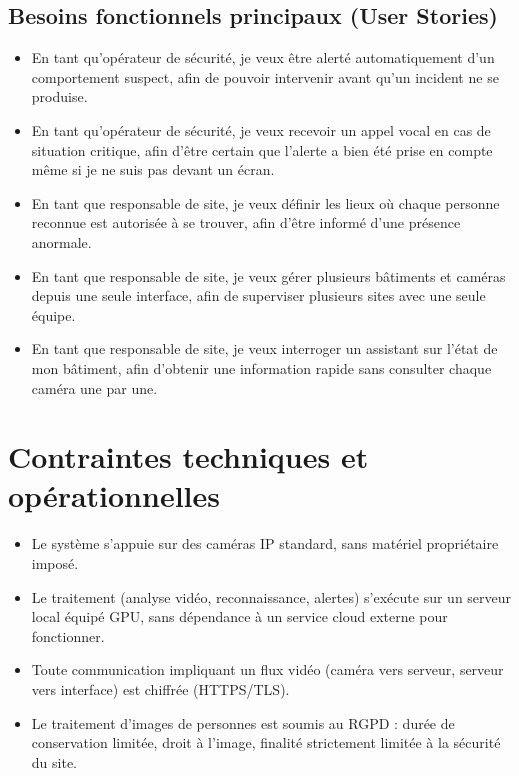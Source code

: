 \documentclass[11pt,a4paper]{article}
\begin{document}
\subsection{Besoins fonctionnels principaux (User Stories)}
\begin{itemize}[leftmargin=1.4em, itemsep=4pt]
  \item En tant qu'opérateur de sécurité, je veux être alerté automatiquement d'un comportement suspect, afin de pouvoir intervenir avant qu'un incident ne se produise.
  \item En tant qu'opérateur de sécurité, je veux recevoir un appel vocal en cas de situation critique, afin d'être certain que l'alerte a bien été prise en compte même si je ne suis pas devant un écran.
  \item En tant que responsable de site, je veux définir les lieux où chaque personne reconnue est autorisée à se trouver, afin d'être informé d'une présence anormale.
  \item En tant que responsable de site, je veux gérer plusieurs bâtiments et caméras depuis une seule interface, afin de superviser plusieurs sites avec une seule équipe.
  \item En tant que responsable de site, je veux interroger un assistant sur l'état de mon bâtiment, afin d'obtenir une information rapide sans consulter chaque caméra une par une.
\end{itemize}

\section{Contraintes techniques et opérationnelles}
\begin{itemize}[leftmargin=1.4em, itemsep=2pt]
  \item Le système s'appuie sur des caméras IP standard, sans matériel propriétaire imposé.
  \item Le traitement (analyse vidéo, reconnaissance, alertes) s'exécute sur un serveur local équipé GPU, sans dépendance à un service cloud externe pour fonctionner.
  \item Toute communication impliquant un flux vidéo (caméra vers serveur, serveur vers interface) est chiffrée (HTTPS/TLS).
  \item Le traitement d'images de personnes est soumis au RGPD : durée de conservation limitée, droit à l'image, finalité strictement limitée à la sécurité du site.
\end{itemize}
\end{document}
